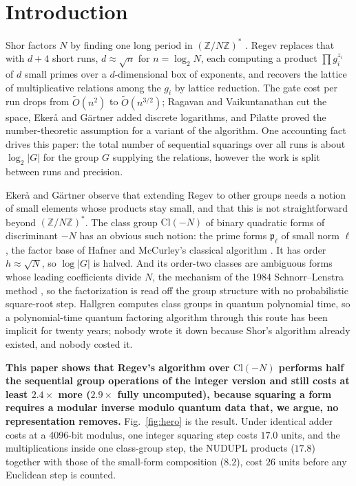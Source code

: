 \documentclass[runningheads]{llncs}
\newcommand{\Cl}{\mathrm{Cl}}
\newcommand{\Z}{\mathbb{Z}}
\newcommand{\p}{\mathfrak{p}}
\begin{document}
\section{Introduction}
Shor factors $N$ by finding one long period in $(\Z/N\Z)^*$ \cite{shor1997}. Regev \cite{regev2023} replaces that with $d+4$ short runs, $d\approx\sqrt n$ for $n=\log_2N$, each computing a product $\prod g_i^{z_i}$ of $d$ small primes over a $d$-dimensional box of exponents, and recovers the lattice of multiplicative relations among the $g_i$ by lattice reduction. The gate cost per run drops from $\tilde O(n^2)$ to $\tilde O(n^{3/2})$; Ragavan and Vaikuntanathan \cite{ragavan2024} cut the space, Eker\aa{} and G\"artner \cite{ekera2024} added discrete logarithms, and Pilatte \cite{pilatte2024} proved the number-theoretic assumption for a variant of the algorithm. One accounting fact drives this paper: the total number of sequential squarings over all runs is about $\log_2|G|$ for the group $G$ supplying the relations, however the work is split between runs and precision.

Eker\aa{} and G\"artner observe that extending Regev to other groups needs a notion of small elements whose products stay small, and that this is not straightforward beyond $(\Z/N\Z)^*$. The class group $\Cl(-N)$ of binary quadratic forms of discriminant $-N$ has an obvious such notion: the prime forms $\p_\ell$ of small norm $\ell$, the factor base of Hafner and McCurley's classical algorithm \cite{hafner1989}. It has order $h\approx\sqrt N$, so $\log|G|$ is halved. And its order-two classes are ambiguous forms whose leading coefficients divide $N$, the mechanism of the 1984 Schnorr--Lenstra method \cite{schnorr1984}, so the factorization is read off the group structure with no probabilistic square-root step. Hallgren \cite{hallgren2005} computes class groups in quantum polynomial time, so a polynomial-time quantum factoring algorithm through this route has been implicit for twenty years; nobody wrote it down because Shor's algorithm already existed, and nobody costed it.

\textbf{This paper shows that Regev's algorithm over $\Cl(-N)$ performs half the sequential group operations of the integer version and still costs at least $2.4\times$ more ($2.9\times$ fully uncomputed), because squaring a form requires a modular inverse modulo quantum data that, we argue, no representation removes.} Fig.~\ref{fig:hero} is the result. Under identical adder costs at a 4096-bit modulus, one integer squaring step costs $17.0$ units, and the multiplications inside one class-group step, the NUDUPL products ($17.8$) together with those of the small-form composition ($8.2$), cost $26$ units before any Euclidean step is counted.
\end{document}
